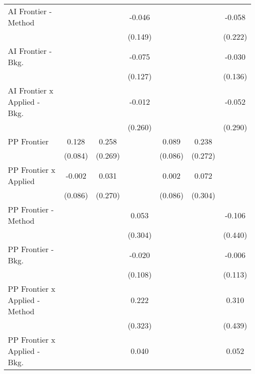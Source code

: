 \begin{tabular}{lcccccc}
   AI Frontier - Method           &         &                & -0.046  &              &               & -0.058\\   
                                  &         &                & (0.149) &              &               & (0.222)\\   
   AI Frontier - Bkg.             &         &                & -0.075  &              &               & -0.030\\   
                                  &         &                & (0.127) &              &               & (0.136)\\   
   AI Frontier x Applied - Bkg.   &         &                & -0.012  &              &               & -0.052\\   
                                  &         &                & (0.260) &              &               & (0.290)\\   
   PP Frontier                    & 0.128   & 0.258          &         & 0.089        & 0.238         &   \\   
                                  & (0.084) & (0.269)        &         & (0.086)      & (0.272)       &   \\   
   PP Frontier x Applied          & -0.002  & 0.031          &         & 0.002        & 0.072         &   \\   
                                  & (0.086) & (0.270)        &         & (0.086)      & (0.304)       &   \\   
   PP Frontier - Method           &         &                & 0.053   &              &               & -0.106\\   
                                  &         &                & (0.304) &              &               & (0.440)\\   
   PP Frontier - Bkg.             &         &                & -0.020  &              &               & -0.006\\   
                                  &         &                & (0.108) &              &               & (0.113)\\   
   PP Frontier x Applied - Method &         &                & 0.222   &              &               & 0.310\\   
                                  &         &                & (0.323) &              &               & (0.439)\\   
   PP Frontier x Applied - Bkg.   &         &                & 0.040   &              &               & 0.052\\   

\end{tabular}
